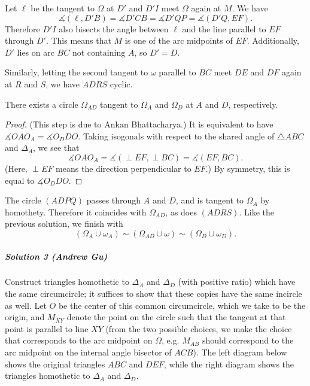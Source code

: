 \documentclass[11pt]{scrartcl}
\begin{document}
Let $\ell$ be the tangent to $\Omega$ at $D'$ and $D'I$ meet $\Omega$ again at
$M$. We have
\[
  \measuredangle(\ell, D'B) = \measuredangle D'CB = \measuredangle D'QP =
  \measuredangle(D'Q, EF).
\]
Therefore $D'I$ also bisects the angle between $\ell$ and the line parallel to
$EF$ through $D'$. This means that $M$ is one of the arc midpoints of $EF$.
Additionally, $D'$ lies on arc $BC$ not containing $A$, so $D'=D$.

Similarly, letting the second tangent to $\omega$ parallel to $BC$ meet $DE$ and
$DF$ again at $R$ and $S$, we have $ADRS$ cyclic.

\begin{lemma*}
  There exists a circle $\Omega_{AD}$ tangent to $\Omega_A$ and $\Omega_D$ at
  $A$ and $D$, respectively.
\end{lemma*}
\begin{proof}
  (This step is due to Ankan Bhattacharya.) It is equivalent to have
  $\measuredangle OAO_A = \measuredangle O_DDO$. Taking isogonals with respect
  to the shared angle of $\triangle ABC$ and $\Delta_A$, we see that
  \[\measuredangle OAO_A = \measuredangle(\perp EF, \perp BC) = \measuredangle
  (EF, BC).\]
  (Here, $\perp EF$ means the direction perpendicular to $EF$.) By symmetry,
  this is equal to $\measuredangle O_DDO$.
\end{proof}

The circle $(ADPQ)$ passes through $A$ and $D$, and is tangent to $\Omega_A$ by
homothety. Therefore it coincides with $\Omega_{AD}$, as does $(ADRS)$. Like the
previous solution, we finish with
\[(\Omega_A\cup \omega_A)\sim (\Omega_{AD}\cup \omega)\sim (\Omega_D\cup
\omega_D).\]

\subparagraph{Solution 3 (Andrew Gu)}
Construct triangles homothetic to $\Delta_A$ and $\Delta_D$ (with positive ratio) which
have the same circumcircle; it suffices to show that these copies have the same
incircle as well. Let $O$ be the center of this common circumcircle, which we
take to be the origin, and $M_{XY}$ denote the point on the circle such that the
tangent at that point is parallel to line $XY$ (from the two possible choices,
we make the choice that corresponds to the arc midpoint on $\Omega$, e.g. $M_{AB}$
should correspond to the arc midpoint on the internal angle bisector of $ACB$).
The left diagram below shows the original triangles $ABC$ and $DEF$, while the
right diagram shows the triangles homothetic to $\Delta_A$ and $\Delta_D$.
\end{document}
